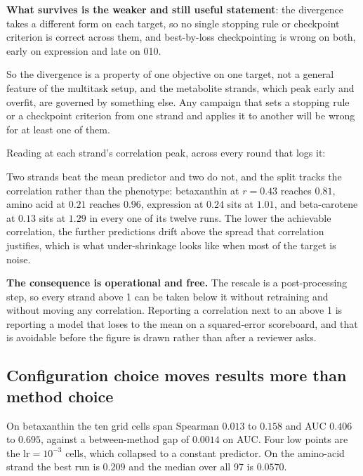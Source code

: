 \textbf{What survives is the weaker and still useful statement}: the divergence takes a
different form on each target, so no single stopping rule or checkpoint criterion is
correct across them, and best-by-loss checkpointing is wrong on both, early on expression
and late on 010.

So the divergence is a property of one objective on one target, not a general feature of
the multitask setup, and the metabolite strands, which peak early and overfit, are governed
by something else. Any campaign that sets a stopping rule or a checkpoint criterion from one
strand and applies it to another will be wrong for at least one of them.

 Reading  at each
strand's correlation peak, across every round that logs it:



Two strands beat the mean predictor and two do not, and the split tracks the correlation
rather than the phenotype: betaxanthin at $r = 0.43$ reaches  $0.81$, amino acid
at $0.21$ reaches $0.96$, expression at $0.24$ sits at $1.01$, and beta-carotene at $0.13$
sits at $1.29$ in every one of its twelve runs. The lower the achievable correlation, the
further predictions drift above the spread that correlation justifies, which is what
under-shrinkage looks like when most of the target is noise.

\textbf{The consequence is operational and free.} The rescale is a post-processing step, so
every strand above 1 can be taken below it without retraining and without moving any
correlation. Reporting a correlation next to an  above 1 is reporting a model
that loses to the mean on a squared-error scoreboard, and that is avoidable before the
figure is drawn rather than after a reviewer asks.

\subsection{Configuration choice moves results more than method choice}

On betaxanthin the ten grid cells span Spearman $0.013$ to $0.158$ and AUC $0.406$ to
$0.695$, against a between-method gap of $0.0014$ on AUC. Four low points are the
$\mathrm{lr} = 10^{-3}$ cells, which collapsed to a constant predictor. On the amino-acid
strand the best run is $0.209$ and the median over all 97 is $0.0570$.

